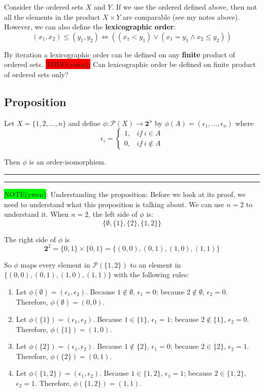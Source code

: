 \documentclass[12pt, letterpaper, oneside]{book}
\begin{document}
Consider the ordered sets $X$ and $Y$. If we use the ordered defined above, then not all the elements in the product
$X \times Y$ are comparable (see my notes above). However, we can also define the \textbf{lexicographic order}:
\[
  (x_1, x_2) \leqslant (y_1, y_2) \Leftrightarrow ((x_1 < y_1) \lor (x_1 = y_1 \land x_2 \leqslant y_2))
\]

By iteration a lexicographic order can be defined on any \textbf{finite} product of ordered sets.
\colorbox{red}{TODO(ywen):} Can lexicographic order be defined on finite product of ordered sets only?

\subsection{Proposition}

Let $X = \{1, 2, \ldots, n\}$ and define $\phi: \mathcal{P}(X) \rightarrow \mathbf{2}^n$ by $\phi(A) = (\epsilon_1, \ldots, \epsilon_n)$
where
\[
  \epsilon_i = \begin{cases}
    1, & if \ i \in A    \\
    0, & if \ i \notin A
  \end{cases}
\]

Then $\phi$ is an order-isomorphism.

\noindent\rule[-9pt]{1cm}{10pt}\rule{10cm}{0.4pt}

\colorbox{lime}{NOTE(ywen)}: Understanding the proposition: Before we look at its proof, we need to understand what
this proposition is talking about. We can use $n = 2$ to understand it. When $n = 2$, the left side of $\phi$ is:
\[
  \{\emptyset, \{1\}, \{2\}, \{1, 2\}\}
\]

The right side of $\phi$ is
\[
  \mathbf{2}^2 = \{0, 1\} \times \{0, 1\} = \{(0, 0), (0, 1), (1, 0), (1, 1)\}
\]

So $\phi$ maps every element in $\mathcal{P}(\{1, 2\})$ to an element in $\{(0, 0), (0, 1), (1, 0), (1, 1)\}$ with the
following rules:
\begin{enumerate}
  \item Let $\phi(\emptyset) = (\epsilon_1, \epsilon_2)$. Because $1 \notin \emptyset$, $\epsilon_1 = 0$; because
        $2 \notin \emptyset$, $\epsilon_2 = 0$. Therefore, $\phi(\emptyset) = (0, 0)$.
  \item Let $\phi(\{1\}) = (\epsilon_1, \epsilon_2)$. Because $1 \in \{1\}$, $\epsilon_1 = 1$; because $2 \notin \{1\}$,
        $\epsilon_2 = 0$. Therefore, $\phi(\{1\}) = (1, 0)$.
  \item Let $\phi(\{2\}) = (\epsilon_1, \epsilon_2)$. Because $1 \notin \{2\}$, $\epsilon_1 = 0$; because $2 \in \{2\}$,
        $\epsilon_2 = 1$. Therefore, $\phi(\{2\}) = (0, 1)$.
  \item Let $\phi(\{1, 2\}) = (\epsilon_1, \epsilon_2)$. Because $1 \in \{1, 2\}$, $\epsilon_1 = 1$; because $2 \in \{1, 2\}$,
        $\epsilon_2 = 1$. Therefore, $\phi(\{1, 2\}) = (1, 1)$.
\end{enumerate}
\end{document}
